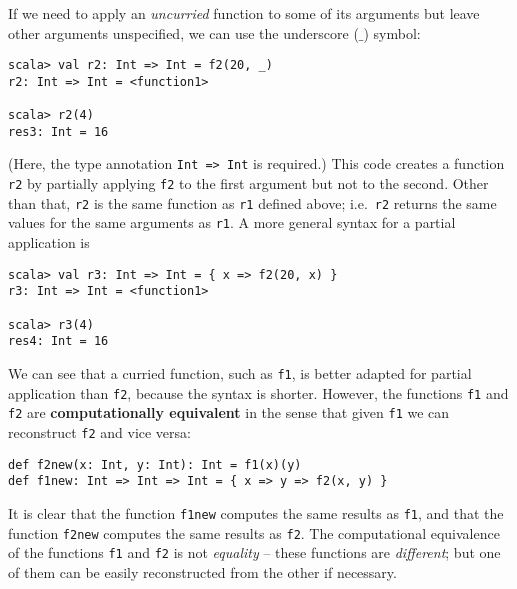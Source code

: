 If we need to apply an \emph{uncurried} function to some of its arguments
but leave other arguments unspecified, we can use the underscore ($\_$)
symbol:
\begin{lstlisting}
scala> val r2: Int => Int = f2(20, _)
r2: Int => Int = <function1>

scala> r2(4)
res3: Int = 16
\end{lstlisting}
(Here, the type annotation \lstinline!Int => Int!
is required.) This code creates a function \lstinline!r2!
by partially applying \lstinline!f2!
to the first argument but not to the second. Other than that, \lstinline!r2!
is the same function as \lstinline!r1!
defined above; i.e.~\lstinline!r2!
returns the same values for the same arguments as \lstinline!r1!.
A more general syntax for a partial application is
\begin{lstlisting}
scala> val r3: Int => Int = { x => f2(20, x) }
r3: Int => Int = <function1>

scala> r3(4)
res4: Int = 16
\end{lstlisting}
We can see that a curried function, such as \lstinline!f1!,
is better adapted for partial application than \lstinline!f2!,
because the syntax is shorter. However, the functions \lstinline!f1!
and \lstinline!f2! are
\textbf{computationally equivalent}
in the sense that given \lstinline!f1!
we can reconstruct \lstinline!f2!
and vice versa:
\begin{lstlisting}
def f2new(x: Int, y: Int): Int = f1(x)(y)
def f1new: Int => Int => Int = { x => y => f2(x, y) }
\end{lstlisting}
It is clear that the function \lstinline!f1new!
computes the same results as \lstinline!f1!,
and that the function \lstinline!f2new!
computes the same results as \lstinline!f2!.
The computational equivalence of the functions \lstinline!f1!
and \lstinline!f2! is not
\emph{equality}  –  these functions are \emph{different}; but one
of them can be easily reconstructed from the other if necessary. 

